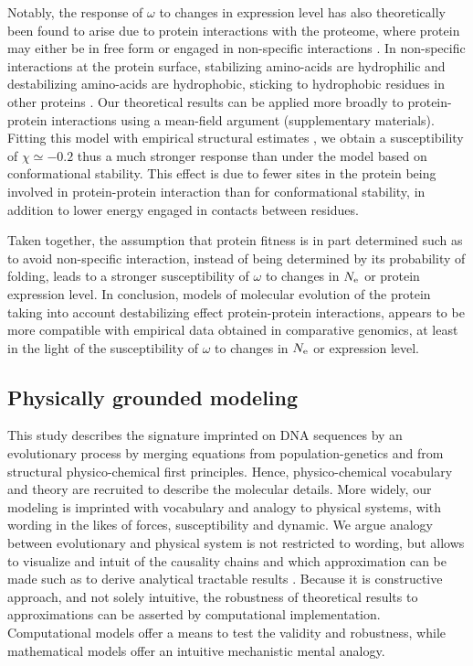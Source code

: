 Notably, the response of $\omega$ to changes in expression level has also theoretically been found to arise due to protein interactions with the proteome, where protein may either be in free form or engaged in non-specific interactions \citep{Yang2012, Zhang2013}.
In non-specific interactions at the protein surface, stabilizing amino-acids are hydrophilic and destabilizing amino-acids are hydrophobic, sticking to hydrophobic residues in other proteins \citep{Dixit2013,Manhart2015}.
Our theoretical results can be applied more broadly to protein-protein interactions using a mean-field argument (supplementary materials).
Fitting this model with empirical structural estimates \citep{Janin1995a, Zhang2008}, we obtain a susceptibility of $\chi \simeq -0.2$ thus a much stronger response than under the model based on conformational stability.
This effect is due to fewer sites in the protein being involved in protein-protein interaction than for conformational stability, in addition to lower energy engaged in contacts between residues.

Taken together, the assumption that protein fitness is in part determined such as to avoid non-specific interaction, instead of being determined by its probability of folding, leads to a stronger susceptibility of $\omega$ to changes in $N_{\mathrm{e}}$ or protein expression level.
In conclusion, models of molecular evolution of the protein taking into account destabilizing effect protein-protein interactions, appears to be more compatible with empirical data obtained in comparative genomics, at least in the light of the susceptibility of $\omega$ to changes in $N_{\mathrm{e}}$ or expression level.

\subsection{Physically grounded modeling}
This study describes the signature imprinted on DNA sequences by an evolutionary process by merging equations from population-genetics and from structural physico-chemical first principles.
Hence, physico-chemical vocabulary and theory are recruited to describe the molecular details.
More widely, our modeling is imprinted with vocabulary and analogy to physical systems, with wording in the likes of forces, susceptibility and dynamic.
We argue analogy between evolutionary and physical system is not restricted to wording, but allows to visualize and intuit of the causality chains and which approximation can be made such as to derive analytical tractable results \cite{Sella2005, Mustonen2009, Bastolla2012, Bastolla2017}.
Because it is constructive approach, and not solely intuitive, the robustness of theoretical results to approximations can be asserted by computational implementation. 
Computational models offer a means to test the validity and robustness, while mathematical models offer an intuitive mechanistic mental analogy.

